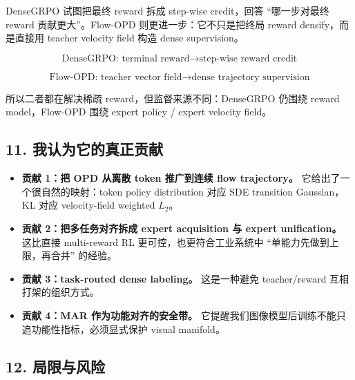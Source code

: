 DenseGRPO 试图把最终 reward 拆成 step-wise credit，回答 ``哪一步对最终 reward 贡献更大''。Flow-OPD 则更进一步：它不只是把终局 reward densify，而是直接用 teacher velocity field 构造 dense supervision。

\[
\text{DenseGRPO: terminal reward}\rightarrow\text{step-wise reward credit}
\]

\[
\text{Flow-OPD: teacher vector field}\rightarrow\text{dense trajectory supervision}
\]

所以二者都在解决稀疏 reward，但监督来源不同：DenseGRPO 仍围绕 reward model，Flow-OPD 围绕 expert policy / expert velocity field。

\subsection{11. 我认为它的真正贡献}

\begin{itemize}[leftmargin=1.5em]
  \item \textbf{贡献 1：把 OPD 从离散 token 推广到连续 flow trajectory。} 它给出了一个很自然的映射：token policy distribution 对应 SDE transition Gaussian，KL 对应 velocity-field weighted $L_2$。
  \item \textbf{贡献 2：把多任务对齐拆成 expert acquisition 与 expert unification。} 这比直接 multi-reward RL 更可控，也更符合工业系统中 ``单能力先做到上限，再合并'' 的经验。
  \item \textbf{贡献 3：task-routed dense labeling。} 这是一种避免 teacher/reward 互相打架的组织方式。
  \item \textbf{贡献 4：MAR 作为功能对齐的安全带。} 它提醒我们图像模型后训练不能只追功能性指标，必须显式保护 visual manifold。
\end{itemize}

\subsection{12. 局限与风险}

